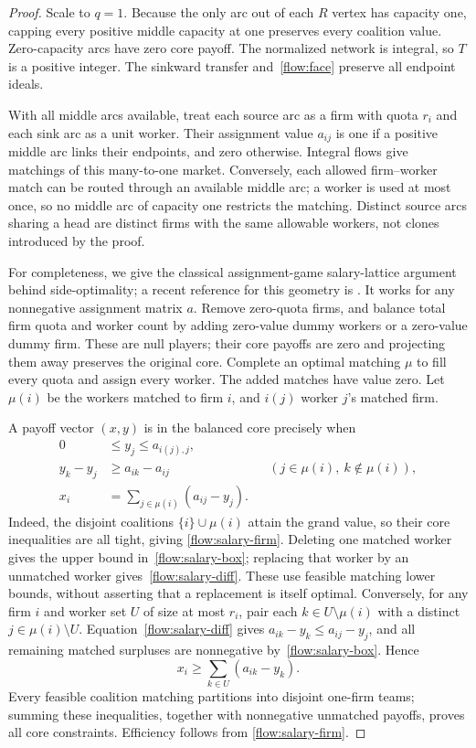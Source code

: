 \begin{proof}
Scale to $q=1$. Because the only arc out of each $R$ vertex has capacity
one, capping every positive middle capacity at one preserves every
coalition value. Zero-capacity arcs have zero core payoff. The normalized
network is integral, so $T$ is a positive integer. The sinkward transfer
and~\eqref{flow:face} preserve all endpoint ideals.

With all middle arcs available, treat each source arc as a firm with
quota $r_i$ and each sink arc as a unit worker. Their assignment value
$a_{ij}$ is one if a positive middle arc links their endpoints, and zero
otherwise. Integral flows give matchings of this many-to-one market.
Conversely, each allowed firm--worker match can be routed through an
available middle arc; a worker is used at most once, so no middle arc
of capacity one restricts the matching. Distinct source arcs sharing a
head are distinct firms with the same allowable workers, not clones
introduced by the proof.

For completeness, we give the classical assignment-game salary-lattice
argument behind side-optimality; a recent reference for this geometry is
\cite{flow:AtayNunezSolymosi2026}. It works for any
nonnegative assignment matrix $a$. Remove zero-quota firms, and balance
total firm quota and worker count by adding zero-value dummy workers
or a zero-value dummy firm. These are null players; their core payoffs
are zero and projecting them away preserves the original core. Complete
an optimal matching $\mu$ to fill every quota and assign every worker.
The added matches have value zero. Let $\mu(i)$ be the workers matched
to firm $i$, and $i(j)$ worker $j$'s matched firm.

A payoff vector $(x,y)$ is in the balanced core precisely when
\begin{align}
 0&\le y_j\le a_{i(j),j},\label{flow:salary-box}\\
 y_k-y_j&\ge a_{ik}-a_{ij}
         &&(j\in\mu(i),\ k\notin\mu(i)),\label{flow:salary-diff}\\
 x_i&=\sum_{j\in\mu(i)}(a_{ij}-y_j).\label{flow:salary-firm}
\end{align}
Indeed, the disjoint coalitions $\{i\}\cup\mu(i)$ attain the grand
value, so their core inequalities are all tight, giving
\eqref{flow:salary-firm}. Deleting one matched worker gives the upper
bound in~\eqref{flow:salary-box}; replacing that worker by an unmatched
worker gives~\eqref{flow:salary-diff}. These use feasible matching
lower bounds, without asserting that a replacement is itself optimal.
Conversely, for any firm $i$ and worker set $U$ of size at most $r_i$,
pair each $k\in U\setminus\mu(i)$ with a distinct
$j\in\mu(i)\setminus U$. Equation~\eqref{flow:salary-diff} gives
$a_{ik}-y_k\le a_{ij}-y_j$, and all remaining matched surpluses are
nonnegative by~\eqref{flow:salary-box}. Hence
\[
                   x_i\ge\sum_{k\in U}(a_{ik}-y_k).
\]
Every feasible coalition matching partitions into disjoint one-firm
teams; summing these inequalities, together with nonnegative unmatched
payoffs, proves all core constraints. Efficiency follows from
\eqref{flow:salary-firm}.


\end{proof}

